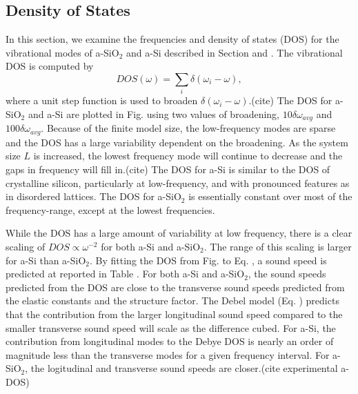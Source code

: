 \documentclass[aps,prb,twocolumn,superscriptaddress,footinbib,amsmath,amssymb,floatfix]{revtex4}
\begin{document}
\subsection{\label{S:DOS}Density of States}

In this section, we examine the frequencies and density of states (DOS)  
for the vibrational modes of a-SiO$_2$ and a-Si described 
in Section and . 
The vibrational DOS is computed by 
\begin{equation}\label{EQ:DOS}
DOS(\omega) = \sum_i \delta(\omega_i - \omega),
\end{equation}
where a unit step function is used to broaden 
$\delta(\omega_i - \omega)$.(cite)  
The DOS for a-SiO$_2$ and a-Si are plotted in Fig. using two values of 
broadening, $10\delta\omega_{avg}$ and $100\delta\omega_{avg}$.  
Because of the finite model size, the low-frequency modes are sparse and 
the DOS has a large variability dependent on the broadening.
\cite{feldman_numerical_1999} 
As the system size $L$ is increased, the lowest frequency mode will 
continue to decrease and the gaps in frequency will fill in.(cite)  
The DOS for a-Si is similar to the 
DOS of crystalline silicon,
\cite{williams_numerical_1985,donadio_atomistic_2009} particularly 
at low-frequency, and with pronounced features as in disordered lattices.
\cite{larkin_predicting_2013,beltukov_ioffe-regel_2013} The DOS for 
a-SiO$_2$ is essentially constant over most of the frequency-range, 
except at the lowest frequencies. 

While the DOS has a large amount of variability at low frequency, 
there is a clear scaling of $DOS \propto \omega^{-2}$ for both 
a-Si and a-SiO$_2$. The range of this 
scaling is larger for a-Si than a-SiO$_2$. 
By fitting the DOS 
from Fig. to Eq. , a sound speed is predicted at reported in Table . 
For both a-Si and a-SiO$_2$, the sound speeds predicted from the DOS 
are close to the transverse sound speeds predicted from the elastic 
constants and the structure factor. The Debel model (Eq. ) predicts 
that the contribution from the larger longitudinal sound speed 
compared to the smaller transverse sound speed will scale as the 
difference cubed. For a-Si, 
the contribution from longitudinal modes to the Debye DOS is nearly 
an order of magnitude less than the transverse modes for a given 
frequency interval. For a-SiO$_2$, the logitudinal and transverse 
sound speeds are closer.(cite experimental a-DOS) 
\end{document}
